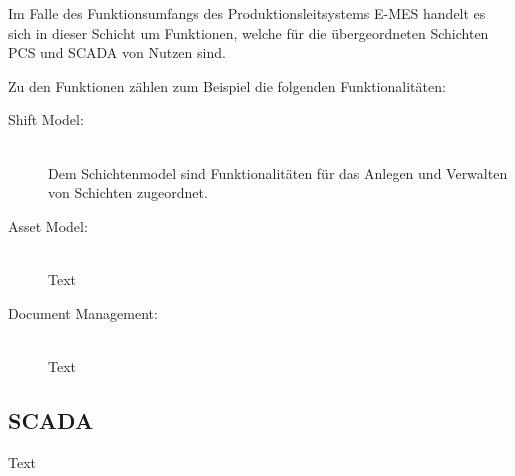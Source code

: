 Im Falle des Funktionsumfangs des Produktionsleitsystems \glqq E-MES\grqq{} handelt es sich in dieser Schicht um Funktionen, welche für die übergeordneten Schichten \glqq PCS\grqq{} und \glqq SCADA\grqq{} von Nutzen sind.

Zu den Funktionen zählen zum Beispiel die folgenden Funktionalitäten:

\begin{description}

    \item[Shift Model:]\hfill \\
    Dem Schichtenmodel sind Funktionalitäten für das Anlegen und Verwalten von Schichten zugeordnet. 

    \item[Asset Model:]\hfill \\
    Text

    \item[Document Management:]\hfill \\
    Text

\end{description}

\subsection{SCADA\label{subsec3.1.3:Unterunterpunkt-3}}

Text





